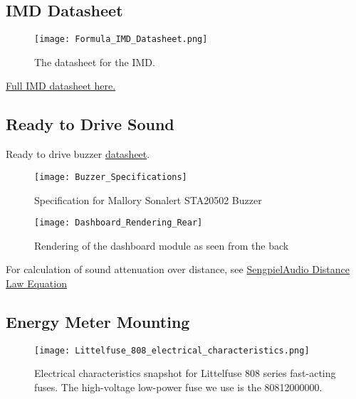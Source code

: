 \documentclass{article}
\begin{document}
\subsection{IMD Datasheet}\label{IMD_datasheet}

\begin{figure} [!ht]
	\centering  %
	
	\texttt{[image: Formula\_IMD\_Datasheet.png]}
	
	\caption{The datasheet for the IMD.}
	
	\label{fig:IMD_Datasheet}
\end{figure}

\href{http://www.bender-us.com/documents/IR155-10_datasheet_NAE1012821.pdf}{Full IMD datasheet here.}

\setcounter{subsection}{11}
\subsection{Ready to Drive Sound}\label{Ready to Drive}
Ready to drive buzzer \href{http://www.mallory-sonalert.com/specifications/STA20502.PDF}{datasheet}. \newline
\begin{figure}[H]
	\texttt{[image: Buzzer\_Specifications]}
	\caption{Specification for Mallory Sonalert STA20502 Buzzer}
\end{figure}

\begin{figure}[H]
	\texttt{[image: Dashboard\_Rendering\_Rear]}
	\caption{Rendering of the dashboard module as seen from the back} \label{fig:Dashboard Render}
\end{figure}

For calculation of sound attenuation over distance, see \href{http://www.sengpielaudio.com/calculator-distance.htm}{SengpielAudio Distance Law Equation}

\subsection{Energy Meter Mounting}\label{appendix_energy_meter_mounting}

\begin{figure} [!ht]
	\centering  %
	\texttt{[image: Littelfuse\_808\_electrical\_characteristics.png]}
	\caption{Electrical characteristics snapshot for Littelfuse 808 series fast-acting fuses. The high-voltage low-power fuse we use is the 80812000000.}	
	\label{fig:littelfuse_808}
\end{figure}
\end{document}
